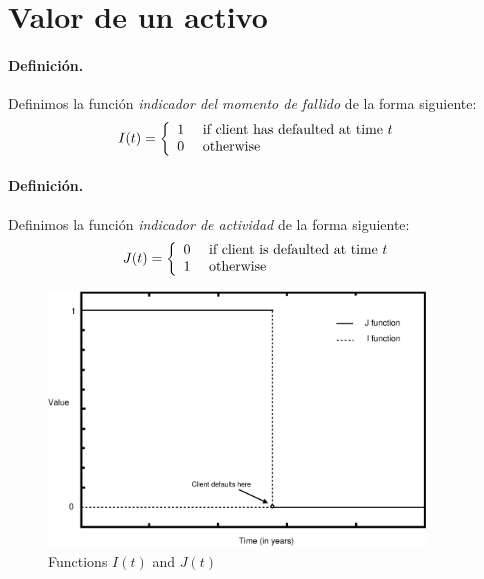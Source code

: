 \section{Valor de un activo}

\paragraph{Definici\'on.} Definimos la funci\'on \emph{indicador del momento de 
fallido} de la forma siguiente:
\begin{displaymath}
I(t) = \left\{
\begin{array}{ll}
1 & \textrm{ if client has defaulted at time } t \cr
0 & \textrm{ otherwise}
\end{array}
\right.
\end{displaymath}

\paragraph{Definici\'on.} Definimos la funci\'on \emph{indicador de actividad}
 de la forma siguiente:
\begin{displaymath}
J(t) = \left\{
\begin{array}{ll}
0 & \textrm{ if client is defaulted at time } t\cr
1 & \textrm{ otherwise}
\end{array}
\right.
\end{displaymath}

\begin{figure}[!hb]
\begin{center}
\includegraphics[width=10cm,angle=0]{./images/functionsIJ.eps}
\caption{Functions $I(t)$ and $J(t)$}
\label{functionsIJ}
\end{center}
\end{figure}

